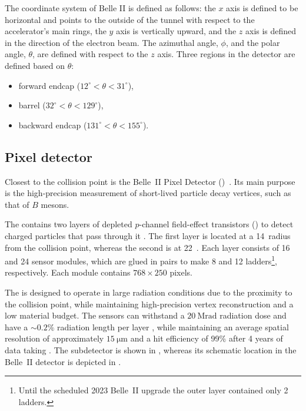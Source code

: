 \vspace{-12pt}
The coordinate system of Belle II is defined as follows: the $x$ axis is defined to be horizontal and points to the outside of the tunnel with respect to the accelerator's
main rings, the $y$ axis is vertically upward, and the $z$ axis is defined in the direction of the electron beam. 
The azimuthal angle, $\phi$, and the polar angle, $\theta$, are defined with respect to the $z$ axis. 
Three regions in the detector are defined based on $\theta$: 
\begin{itemize}
    \item forward endcap (\mbox{$12^{\circ}<\theta<31^{\circ}$}), 
    \item barrel (\mbox{$32^{\circ}<\theta<129^{\circ}$}),
    \item backward endcap (\mbox{$131^{\circ}<\theta<155^{\circ}$}).
\end{itemize}


\subsection{Pixel detector}\label{sec:pxd}

Closest to the collision point is the Belle~II Pixel Detector (\PXD)~\cite{Belle-II:2010dht}.
Its main purpose is the high-precision measurement of short-lived particle decay vertices, such as that of $B$ mesons.

The \PXD contains two layers of depleted $p$-channel field-effect transistors (\DEPFET) to detect charged particles that pass through it \cite{Kemmer:1986vh}.
The first layer is located at a 14~\mm radius from the collision point, whereas the second is at 22~\mm.
Each layer consists of 16 and 24 sensor modules, which are glued in pairs to make 8 and 12 ladders\footnote{Until the scheduled 2023 Belle~II upgrade the outer layer contained only 2 ladders.}, respectively.
Each module contains $768\times250$ \DEPFET pixels.

The \PXD is designed to operate in large radiation conditions due to the proximity to the collision point,
while maintaining high-precision vertex reconstruction and a low material budget.
The sensors can withstand a $20~\si{\mega\radian}$ 
radiation dose and have a $\sim 0.2\%$ radiation length per layer \cite{Belle-II:2010dht},
while maintaining an average spatial resolution of approximately $15~\si{\micro\meter}$ and a hit efficiency of 99\% after 4 years of data taking \cite{Belle-IIDEPFET:2022wis}.
The subdetector is shown in , whereas its schematic location in the Belle~II detector is depicted in .

